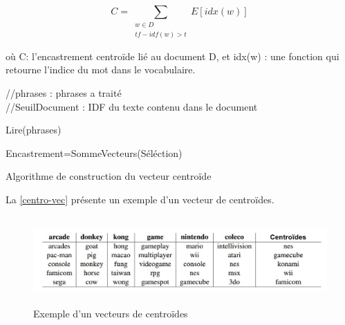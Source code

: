              \begin{equation*}
             C = \sum_{\substack{w\in D\\
                             tf-idf(w)>t }}
                    E[idx(w)]
             \end{equation*}
             
             où C: l'encastrement centroïde lié au document D, et idx(w) : une fonction qui retourne l'indice du mot dans le vocabulaire.\\
             
             \begin{algorithm2e}[H]
                \SetAlgoLined
                //phrases : phrases a traité\\
                //SeuilDocument : IDF du texte contenu dans le document\\
                
                Lire(phrases)\\
                
                Encastrement=SommeVecteurs(Séléction)
                
                \caption{Algorithme de construction du vecteur centroïde}
             \end{algorithm2e}
             
             \vspace*{0.5cm}
             La \autoref{centro-vec} présente un exemple d'un vecteur de centroïdes. 
              \begin{figure}[H]
                 \centering
                \includegraphics[height=95pt,width=420pt]{img/chapter3/centroideembed.jpg}
                \caption{Exemple d'un vecteurs de centroïdes \cite{notreresume}}
                \label{centro-vec}
             \end{figure}
         \vspace*{0.1cm}    
